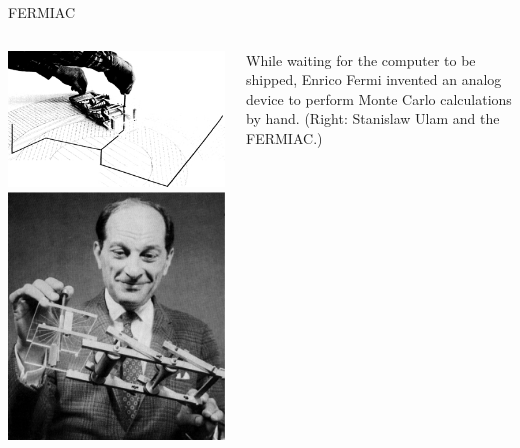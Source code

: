 \documentclass[aspectratio=169]{beamer}
\begin{document}
\begin{frame}{FERMIAC}
\begin{columns}
\begin{center}
\includegraphics[height=5.5 cm]{PLOTS/FERMIAC.jpg}\hspace{0.25 cm}\includegraphics[height=5.5 cm]{PLOTS/STAN_ULAM_HOLDING_THE_FERMIAC.jpg}
\end{center}

While waiting for the computer to be shipped, Enrico Fermi invented an analog device to perform Monte Carlo calculations by hand. (Right: Stanislaw Ulam and the FERMIAC.)
\end{columns}
\end{frame}
\end{document}
